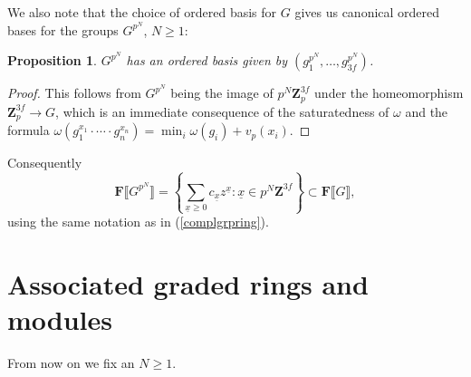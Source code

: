 \documentclass[11pt, oneside]{article}
\newtheorem{proposition}{Proposition}
\theoremstyle{definition}
\begin{document}
	We also note that the choice of ordered basis for $G$ gives us canonical ordered bases for the groups $G^{p^N}$, $N\geq1$:
	\begin{proposition}
		$G^{p^N}$ has an ordered basis given by $\left(g_1^{p^N},\dots,g_{3f}^{p^N}\right)$.
	\end{proposition}
	\begin{proof}
		This follows from $G^{p^N}$ being the image of $p^N\mathbf Z_p^{3f}$ under the homeomorphism $\mathbf Z_p^{3f}\to G$, which is an immediate consequence of the saturatedness of $\omega$ and the formula $\omega(g_1^{x_1}\cdot\cdots\cdot g_n^{x_n})=\min_i\omega(g_i)+v_p(x_i)$.
	\end{proof}
	Consequently \begin{equation}\label{groupringpN}\mathbf F\llbracket G^{p^N}\rrbracket=\left\{\sum_{\underline x\geq0}c_{\underline x}z^{\underline x}\colon \underline x\in p^N\mathbf Z^{3f}\right\}\subset\mathbf F\llbracket G\rrbracket,\end{equation} using the same notation as in (\ref{complgrpring}).
	\section{Associated graded rings and modules}
	From now on we fix an $N\geq1$.\\
	
\end{document}
